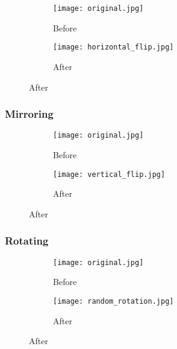 \begin{figure}[H]
	\centering
	\begin{subfigure}{0.45\textwidth}
		\texttt{[image: original.jpg]}
		\caption{Before}
		\label{fig:original}
	\end{subfigure}
	\hfill
	\begin{subfigure}{0.45\textwidth}
		\texttt{[image: horizontal\_flip.jpg]}
		\caption{After}
		\label{fig:horizontal_flip}
	\end{subfigure}
	\label{fig:comparison}
\end{figure}

\subsubsection{Mirroring}

\begin{figure}[H]
	\centering
	\begin{subfigure}{0.45\textwidth}
		\texttt{[image: original.jpg]}
		\caption{Before}
		\label{fig:original}
	\end{subfigure}
	\hfill
	\begin{subfigure}{0.45\textwidth}
		\texttt{[image: vertical\_flip.jpg]}
		\caption{After}
		\label{fig:horizontal_flip}
	\end{subfigure}
	\label{fig:comparison}
\end{figure}

\newpage

\subsubsection{Rotating}

\begin{figure}[H]
	\centering
	\begin{subfigure}{0.45\textwidth}
		\texttt{[image: original.jpg]}
		\caption{Before}
		\label{fig:original}
	\end{subfigure}
	\hfill
	\begin{subfigure}{0.45\textwidth}
		\texttt{[image: random\_rotation.jpg]}
		\caption{After}
		\label{fig:horizontal_flip}
	\end{subfigure}
	\label{fig:comparison}
\end{figure}

